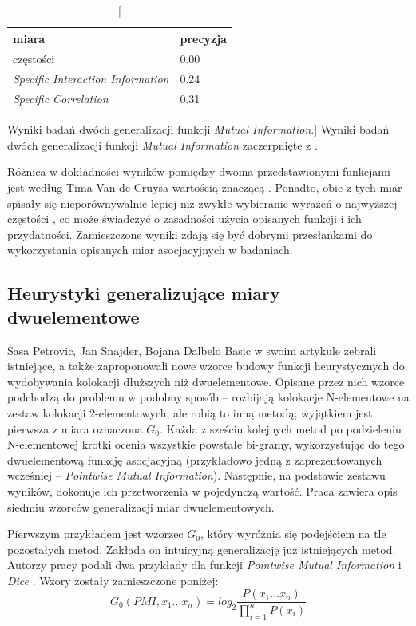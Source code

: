 \begin{table}[h!]
\centering
\begin{tabular}{l | l}
	\toprule
	\textbf{miara} 							& \textbf{precyzja}	\\
	\midrule
	częstości								& 0.00				\\
	\emph{Specific Interaction Information}	& 0.24				\\
	\emph{Specific Correlation}				& 0.31				\\
	\bottomrule
\end{tabular}
\caption
	[Wyniki badań dwóch generalizacji funkcji \emph{Mutual Information}.]
	{Wyniki badań dwóch generalizacji funkcji \emph{Mutual Information} zaczerpnięte z \cite[str. 4]{mmi_w11}.}
\label{mmi_results}
\end{table}
Różnica w dokładności wyników pomiędzy dwoma przedstawionymi funkcjami jest według Tima Van de Cruysa wartością znaczącą \cite[str. 5]{mmi_w11}.
Ponadto, obie z tych miar spisały się nieporównywalnie lepiej niż zwykłe wybieranie wyrażeń o najwyższej częstości \cite[str. 5]{mmi_w11}, co może świadczyć o zasadności użycia opisanych funkcji i ich przydatności.
Zamieszczone wyniki zdają się być dobrymi przesłankami do wykorzystania opisanych miar asocjacyjnych w badaniach.


\subsection{Heurystyki generalizujące miary dwuelementowe}
Sasa Petrovic, Jan Snajder, Bojana Dalbelo Basic w swoim artykule \cite{generalization_patterns} zebrali istniejące, a także zaproponowali nowe wzorce budowy funkcji heurystycznych do wydobywania kolokacji dłuższych niż dwuelementowe.
Opisane przez nich wzorce podchodzą do problemu w podobny sposób -- rozbijają kolokacje N-elementowe na zestaw kolokacji 2-elementowych, ale robią to inną metodą; wyjątkiem jest pierwsza z miara oznaczona \( G_{0} \).
Każda z sześciu kolejnych metod po podzieleniu N-elementowej krotki ocenia wszystkie powstałe bi-gramy, wykorzystując do tego dwuelementową funkcję asocjacyjną (przykładowo jedną z zaprezentowanych wcześniej -- \emph{Pointwise Mutual Information}).
Następnie, na podstawie zestawu wyników, dokonuje ich przetworzenia w pojedynczą wartość.
Praca zawiera opis siedmiu wzorców generalizacji miar dwuelementowych.

\par
Pierwszym przykładem jest wzorzec \( G_{0} \), który wyróżnia się podejściem na tle pozostałych metod.
Zakłada on intuicyjną generalizację już istniejących metod.
Autorzy pracy podali dwa przykłady dla funkcji \emph{Pointwise Mutual Information} i \emph{Dice} \cite[str. 4]{generalization_patterns}.
Wzory zostały zamieszczone poniżej:
$$ G_{0}(PMI, x_{1} ... x_{n}) = log_{2} \frac{P(x_{1} ... x_{n})}{\prod_{i = 1}^{n} P(x_{i})} $$

